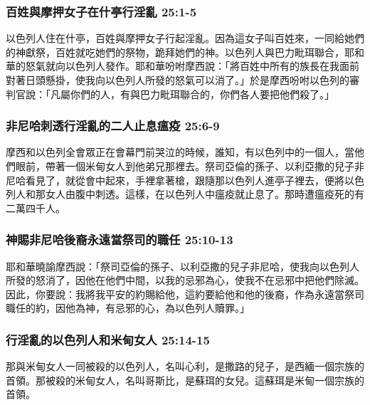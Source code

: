 \subsubsection{百姓與摩押女子在什亭行淫亂 25:1-5}
以色列人住在什亭，百姓與摩押女子行起淫亂。因為這女子叫百姓來，一同給她們的神獻祭，百姓就吃她們的祭物，跪拜她們的神。以色列人與巴力毗珥聯合，耶和華的怒氣就向以色列人發作。耶和華吩咐摩西說：「將百姓中所有的族長在我面前對著日頭懸掛，使我向以色列人所發的怒氣可以消了。」於是摩西吩咐以色列的審判官說：「凡屬你們的人，有與巴力毗珥聯合的，你們各人要把他們殺了。」




\subsubsection{非尼哈刺透行淫亂的二人止息瘟疫 25:6-9}
摩西和以色列全會眾正在會幕門前哭泣的時候，誰知，有以色列中的一個人，當他們眼前，帶著一個米甸女人到他弟兄那裡去。祭司亞倫的孫子、以利亞撒的兒子非尼哈看見了，就從會中起來，手裡拿著槍，跟隨那以色列人進亭子裡去，便將以色列人和那女人由腹中刺透。這樣，在以色列人中瘟疫就止息了。那時遭瘟疫死的有二萬四千人。

\subsubsection{神賜非尼哈後裔永遠當祭司的職任 25:10-13}
耶和華曉諭摩西說：「祭司亞倫的孫子、以利亞撒的兒子非尼哈，使我向以色列人所發的怒消了，因他在他們中間，以我的忌邪為心，使我不在忌邪中把他們除滅。因此，你要說：我將我平安的約賜給他，這約要給他和他的後裔，作為永遠當祭司職任的約，因他為神，有忌邪的心，為以色列人贖罪。」

\subsubsection{行淫亂的以色列人和米甸女人 25:14-15}
那與米甸女人一同被殺的以色列人，名叫心利，是撒路的兒子，是西緬一個宗族的首領。那被殺的米甸女人，名叫哥斯比，是蘇珥的女兒。這蘇珥是米甸一個宗族的首領。

\newpage
